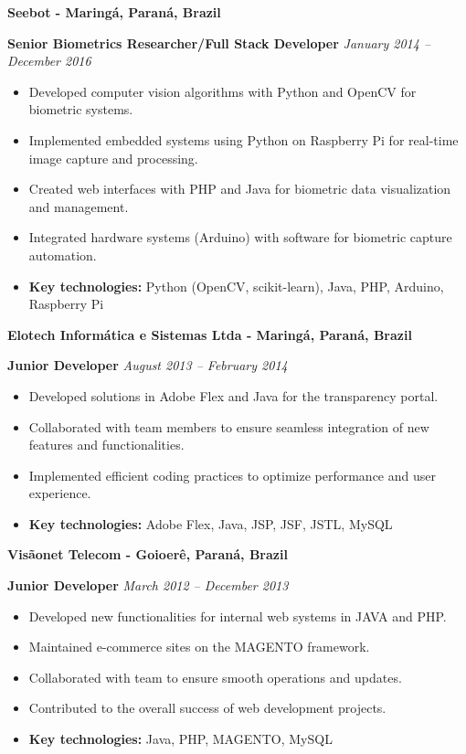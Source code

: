 \documentclass[12pt,a4paper,sans]{moderncv}        %
\begin{document}
\vspace{24pt}
\small{\textbf{Seebot - Maringá, Paraná, Brazil}}
\vspace{3pt}

\textbf{Senior Biometrics Researcher/Full Stack Developer} \hfill \textit{January 2014 -- December 2016}
\begin{itemize}
    \item Developed computer vision algorithms with Python and OpenCV for biometric systems.
    \item Implemented embedded systems using Python on Raspberry Pi for real-time image capture and processing.
    \item Created web interfaces with PHP and Java for biometric data visualization and management.
    \item Integrated hardware systems (Arduino) with software for biometric capture automation.
    \item \textbf{Key technologies:} Python (OpenCV, scikit-learn), Java, PHP, Arduino, Raspberry Pi
\end{itemize}

\vspace{24pt}
\small{\textbf{Elotech Informática e Sistemas Ltda - Maringá, Paraná, Brazil}}
\vspace{3pt}

\textbf{Junior Developer} \hfill \textit{August 2013 -- February 2014}
\begin{itemize}
    \item Developed solutions in Adobe Flex and Java for the transparency portal.
    \item Collaborated with team members to ensure seamless integration of new features and functionalities.
    \item Implemented efficient coding practices to optimize performance and user experience.
    \item \textbf{Key technologies:} Adobe Flex, Java, JSP, JSF, JSTL, MySQL
\end{itemize}

\vspace{24pt}
\small{\textbf{Visãonet Telecom - Goioerê, Paraná, Brazil}}
\vspace{3pt}

\textbf{Junior Developer} \hfill \textit{March 2012 -- December 2013}
\begin{itemize}
    \item Developed new functionalities for internal web systems in JAVA and PHP.
    \item Maintained e-commerce sites on the MAGENTO framework.
    \item Collaborated with team to ensure smooth operations and updates.
    \item Contributed to the overall success of web development projects.
    \item \textbf{Key technologies:} Java, PHP, MAGENTO, MySQL
\end{itemize}
\end{document}
